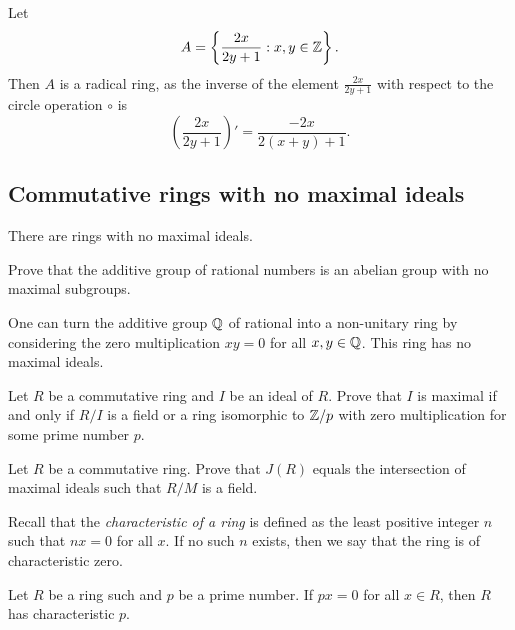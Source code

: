 \begin{example}
	Let 
	\[
	A=\left\{\frac{2x}{2y+1}:x,y\in\mathbb{Z}\right\}.
	\]
	Then $A$ is a radical ring, as the inverse of the element $\frac{2x}{2y+1}$
	with respect to the circle operation 
	$\circ$ is 
	\[
	\left(\frac{2x}{2y+1}\right)'=\frac{-2x}{2(x+y)+1}.
	\]
\end{example}

\subsection{Commutative rings with no maximal ideals}

There are rings with no maximal ideals. 

\begin{exercise}
\label{xca:Q_no_maximals}
    Prove that the additive group of rational numbers is an abelian group
with no maximal subgroups.
\end{exercise}

One can turn the additive group $\mathbb{Q}$ of rational into a non-unitary 
ring by considering the zero multiplication $xy=0$ for all $x,y\in\mathbb{Q}$. This 
ring has no maximal ideals. 


\begin{exercise}
\label{xca:R/I_field_or_zero}
    Let $R$ be a commutative ring 
    and $I$ be an ideal of $R$. Prove that
    $I$ is maximal if and only if $R/I$ is a field
    or a ring isomorphic to 
    $\mathbb{Z}/p$ with zero multiplication for some prime number $p$. 
\end{exercise}

\begin{exercise}
    \label{xca:J(R)_fields}
    Let $R$ be a commutative ring. Prove that
    $J(R)$ equals the intersection of maximal ideals 
    such that $R/M$ is a field. 
\end{exercise}

Recall that the \emph{characteristic of a ring} is defined as the least positive
integer $n$ such that $nx=0$ for all $x$. If no such $n$ exists, 
then we say that the ring is of characteristic zero. 

\begin{exercise}
\label{xca:characteristic}
    Let $R$ be a ring such and $p$ be a prime number. 
    If $px=0$ for all $x\in R$, then $R$ has characteristic $p$. 
\end{exercise}

